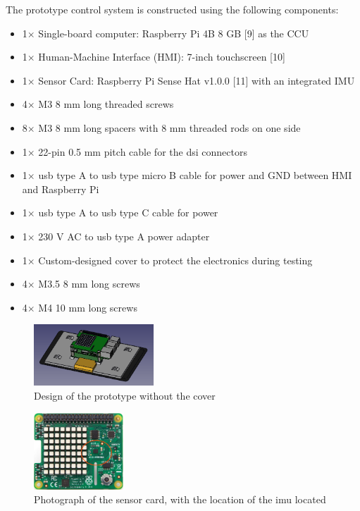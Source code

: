 \documentclass[../main.tex]{subfiles}
\begin{document}
    The prototype control system is constructed using the following components:

    \begin{itemize}
        \item 1$\times$ Single-board computer: Raspberry Pi 4B 8 GB [9] as the CCU
        \item 1$\times$ Human-Machine Interface (HMI): 7-inch touchscreen [10]
        \item 1$\times$ Sensor Card: Raspberry Pi Sense Hat v1.0.0 [11] with an integrated IMU
        \item 4$\times$ M3 8 mm long threaded screws
        \item 8$\times$ M3 8 mm long spacers with 8 mm threaded rods on one side
        \item 1$\times$ 22-pin 0.5 mm pitch cable for the \gls{dsi} connectors
        \item 1$\times$ \gls{usb} type A to \gls{usb} type micro B cable for power and GND between HMI and Raspberry Pi
        \item 1$\times$ \gls{usb} type A to \gls{usb} type C cable for power
        \item 1$\times$ 230 V AC to \gls{usb} type A power adapter
        \item 1$\times$ Custom-designed cover to protect the electronics during testing
        \item 4$\times$ M3.5 8 mm long screws
        \item 4$\times$ M4 10 mm long screws
    \end{itemize}

    \begin{figure}[htbp!]
        \centering
        \includegraphics[width=0.4\textwidth]{resources/images/rpi_without_cover.png}
        \caption{Design of the prototype without the cover}
        \label{fig:prototype_graphics_without_cover}
    \end{figure}

    \begin{figure}[htbp]
        \centering
        \includegraphics[width=0.3\textwidth]{resources/images/raspberry-pi-sense-hat-imu-in-circle.png}
        \caption{Photograph of the sensor card, with the location of the \gls{imu} located}
        \label{fig:raspberry-pi-sense-hat-imu-in-circle}
    \end{figure}
\end{document}
